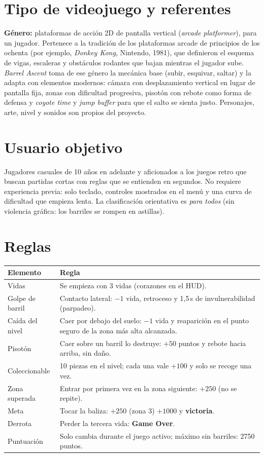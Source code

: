 \documentclass[11pt,letterpaper]{article}
\begin{document}
\section{Tipo de videojuego y referentes}
\textbf{Género:} plataformas de acción 2D de pantalla vertical (\emph{arcade platformer}),
para un jugador. Pertenece a la tradición de los plataformas arcade de principios de los ochenta
(por ejemplo, \emph{Donkey Kong}, Nintendo, 1981), que definieron el esquema de vigas,
escaleras y obstáculos rodantes que bajan mientras el jugador sube. \emph{Barrel Ascent} toma
de ese género la mecánica base (subir, esquivar, saltar) y la adapta con elementos modernos:
cámara con desplazamiento vertical en lugar de pantalla fija, zonas con dificultad progresiva,
pisotón con rebote como forma de defensa y \emph{coyote time} y \emph{jump buffer} para que el salto
se sienta justo. Personajes, arte, nivel y sonidos son propios del proyecto.

\section{Usuario objetivo}
Jugadores casuales de 10 años en adelante y aficionados a los juegos retro que buscan partidas cortas
con reglas que se entienden en segundos. No requiere experiencia previa: solo teclado, controles
mostrados en el menú y una curva de dificultad que empieza lenta. La clasificación orientativa es
\emph{para todos} (sin violencia gráfica: los barriles se rompen en astillas).

\section{Reglas}
\begin{tabularx}{\linewidth}{@{}lX@{}}
\toprule
\textbf{Elemento} & \textbf{Regla} \\ \midrule
Vidas & Se empieza con 3 vidas (corazones en el HUD). \\
Golpe de barril & Contacto lateral: $-1$ vida, retroceso y 1,5\,s de invulnerabilidad (parpadeo). \\
Caída del nivel & Caer por debajo del suelo: $-1$ vida y reaparición en el punto seguro de la zona más alta alcanzada. \\
Pisotón & Caer sobre un barril lo destruye: $+50$ puntos y rebote hacia arriba, sin daño. \\
Coleccionable & 10 piezas en el nivel; cada una vale $+100$ y solo se recoge una vez. \\
Zona superada & Entrar por primera vez en la zona siguiente: $+250$ (no se repite). \\
Meta & Tocar la baliza: $+250$ (zona 3) $+1000$ y \textbf{victoria}. \\
Derrota & Perder la tercera vida: \textbf{Game Over}. \\
Puntuación & Solo cambia durante el juego activo; máximo sin barriles: 2750 puntos. \\
\bottomrule
\end{tabularx}
\end{document}
